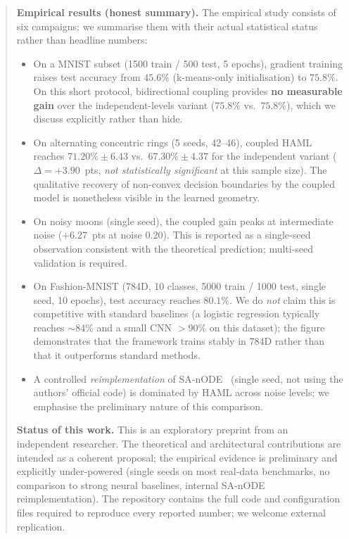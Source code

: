\documentclass[11pt,a4paper]{article}
\begin{document}
\begin{abstract}
\textbf{Empirical results (honest summary).}
The empirical study consists of six campaigns; we summarise them with their actual
statistical status rather than headline numbers:
\begin{itemize}
  \item On a MNIST subset (1500 train / 500 test, 5 epochs), gradient training raises test
        accuracy from $45.6\%$ (k-means-only initialisation) to $75.8\%$. On this short
        protocol, bidirectional coupling provides \textbf{no measurable gain} over the
        independent-levels variant ($75.8\%$ vs.\ $75.8\%$), which we discuss explicitly
        rather than hide.
  \item On alternating concentric rings (5 seeds, 42--46), coupled HAML reaches
        $71.20\% \pm 6.43$ vs.\ $67.30\% \pm 4.37$ for the independent variant
        ($\Delta = +3.90$~pts, \emph{not statistically significant} at this sample size).
        The qualitative recovery of non-convex decision boundaries by the coupled model is
        nonetheless visible in the learned geometry.
  \item On noisy moons (single seed), the coupled gain peaks at intermediate noise
        ($+6.27$~pts at noise $0.20$). This is reported as a single-seed observation
        consistent with the theoretical prediction; multi-seed validation is required.
  \item On Fashion-MNIST (784D, 10 classes, 5000 train / 1000 test, single seed,
        10 epochs), test accuracy reaches $80.1\%$. We do \emph{not} claim this is
        competitive with standard baselines (a logistic regression typically reaches
        $\sim$84\% and a small CNN $>90\%$ on this dataset); the figure demonstrates that
        the framework trains stably in 784D rather than that it outperforms standard
        methods.
  \item A controlled \emph{reimplementation} of SA-nODE~\cite{marino2024} (single seed,
        not using the authors' official code) is dominated by HAML across noise levels;
        we emphasise the preliminary nature of this comparison.
\end{itemize}

\textbf{Status of this work.} This is an exploratory preprint from an independent
researcher. The theoretical and architectural contributions are intended as a coherent
proposal; the empirical evidence is preliminary and explicitly under-powered (single
seeds on most real-data benchmarks, no comparison to strong neural baselines, internal
SA-nODE reimplementation). The repository contains the full code and configuration files
required to reproduce every reported number; we welcome external replication.


\end{abstract}
\end{document}
